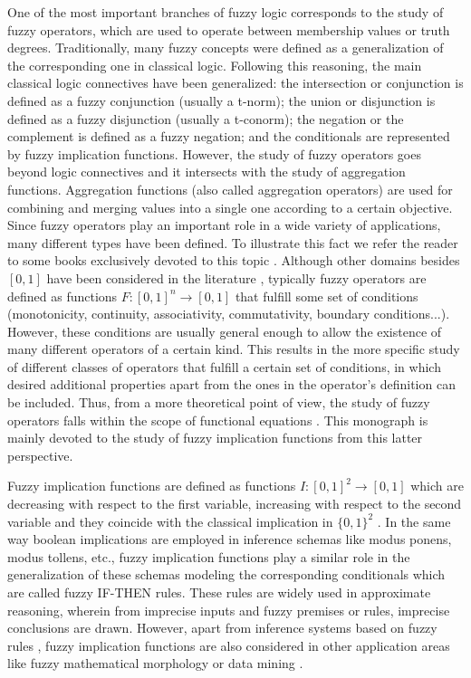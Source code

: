 One of the most important branches of fuzzy logic corresponds to the study of fuzzy operators, which are used to operate between membership values or truth degrees. Traditionally, many fuzzy concepts were defined as a generalization of the corresponding one in classical logic. Following this reasoning, the main classical logic connectives have been generalized: the intersection or conjunction is defined as a fuzzy conjunction (usually a t-norm); the union or disjunction is defined as a fuzzy disjunction (usually a t-conorm); the negation or the complement is defined as a fuzzy negation; and the conditionals are represented by fuzzy implication functions. However, the study of fuzzy operators goes beyond logic connectives and it intersects with the study of aggregation functions. Aggregation functions (also called aggregation operators) are used for combining and merging values into a single one according to a certain objective. Since fuzzy operators play an important role in a wide variety of applications, many different types have been defined. To illustrate this fact we refer the reader to some books exclusively devoted to this topic \cite{Klement2000,Calvo2002,Baczynski2008,Beliakov2010,Grabisch2009,Alsina2006}. Although other domains besides $[0,1]$ have been considered in the literature \cite{Goguen1967,Munar2023}, typically fuzzy operators are defined as functions $F:[0,1]^n \to [0,1]$ that fulfill some set of conditions (monotonicity, continuity, associativity, commutativity, boundary conditions...). However, these conditions are usually general enough to allow the existence of many different operators of a certain kind. This results in the more specific study of different classes of operators that fulfill a certain set of conditions, in which desired additional properties apart from the ones in the operator's definition can be included. Thus, from a more theoretical point of view, the study of fuzzy operators falls within the scope of functional equations \cite{Kuczma1968,Aczel1966}. This monograph is mainly devoted to the study of fuzzy implication functions from this latter perspective.

Fuzzy implication functions are defined as functions $I:[0,1]^2 \to [0,1]$ which are decreasing with respect to the first variable, increasing with respect to the second variable and they coincide with the classical implication in $\{0,1\}^2$ \cite{Baczynski2008,Fodor1994}. In the same way boolean implications are employed in inference schemas like modus ponens, modus tollens, etc., fuzzy implication functions play a similar role in the generalization of these schemas modeling the corresponding conditionals which are called fuzzy IF-THEN rules. These rules are widely used in approximate reasoning, wherein from imprecise inputs and fuzzy premises or rules, imprecise conclusions are drawn. However, apart from inference systems based on fuzzy rules \cite{Combs1998,Jayaram2008,Jayaram2008B}, fuzzy implication functions are also considered in other application areas like fuzzy mathematical morphology or data mining \cite{Baczynski2015}.

